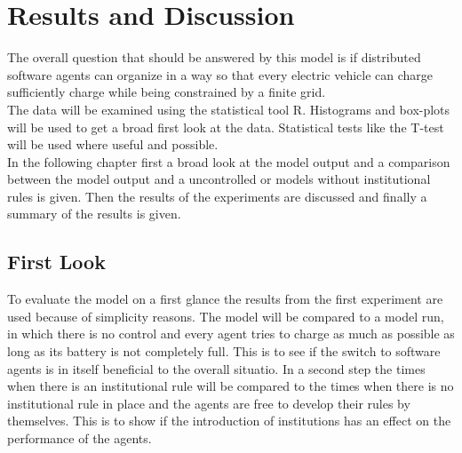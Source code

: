 \documentclass[a4paper]{article}
\begin{document}
\clearpage
\section{Results and Discussion}
The overall question that should be answered by this model is if distributed software agents can organize in a way so that 
every electric vehicle can charge sufficiently charge while being constrained by a finite grid. \\
The data will be examined using the statistical tool R. Histograms and box-plots will be used to get a broad first look at the data. 
Statistical tests like the T-test will be used where useful and possible.\\
In the following chapter first a broad look at the model output and a comparison between the model output and a uncontrolled or 
models without institutional rules is given. Then the results of the experiments are discussed and finally a summary of the results is 
given.
\subsection{First Look}
To evaluate the model on a first glance the results from the first experiment are used because of simplicity reasons. The 
model will be compared to a model run, in which there is no control and every agent tries to charge as much as possible as long as 
its battery is not completely full. This is to see if the switch to software agents is in itself beneficial to the overall situatio.
In a second step the times when there is an institutional rule will be compared to the times when there is no institutional 
rule in place and the agents are free to develop their rules by themselves. This is to show if the introduction of institutions has an 
effect on the performance of the agents. 
\end{document}

